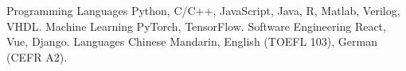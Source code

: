 
\begin{cvskills}
  \cvskill
    {Programming Languages}
    {Python, C/C++, JavaScript, Java, R, Matlab, Verilog, VHDL.}
  \cvskill
    {Machine Learning}
    {PyTorch, TensorFlow.}
  \cvskill
    {Software Engineering}
    {React, Vue, Django.}
  \cvskill
    {Languages}
    {Chinese Mandarin, English (TOEFL 103), German (CEFR A2).}

\end{cvskills}
